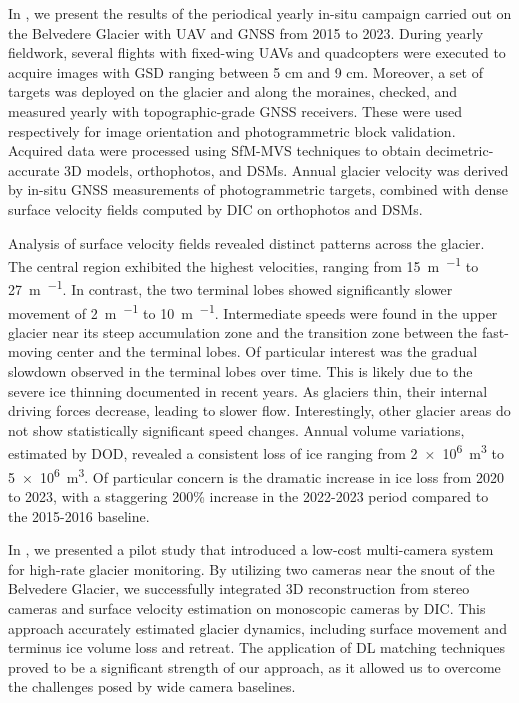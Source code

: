 In , we present the results of the periodical yearly in-situ campaign carried out on the Belvedere Glacier with UAV and GNSS from 2015 to 2023.
During yearly fieldwork, several flights with fixed-wing UAVs and quadcopters were executed to acquire images with GSD ranging between 5 cm and 9 cm. 
Moreover, a set of targets was deployed on the glacier and along the moraines, checked, and measured yearly with topographic-grade GNSS receivers.
These were used respectively for image orientation and photogrammetric block validation.
Acquired data were processed using SfM-MVS techniques to obtain decimetric-accurate 3D models, orthophotos, and DSMs. 
Annual glacier velocity was derived by in-situ GNSS measurements of photogrammetric targets, combined with dense surface velocity fields computed by DIC on orthophotos and DSMs. 

Analysis of surface velocity fields revealed distinct patterns across the glacier. 
The central region exhibited the highest velocities, ranging from \SI{15}{\meter\per\year} to \SI{27}{\meter\per\year}.
In contrast, the two terminal lobes showed significantly slower movement of \SI{2}{\meter\per\year} to \SI{10}{\meter\per\year}.
Intermediate speeds were found in the upper glacier near its steep accumulation zone and the transition zone between the fast-moving center and the terminal lobes.  
Of particular interest was the gradual slowdown observed in the terminal lobes over time.
This is likely due to the severe ice thinning documented in recent years. 
As glaciers thin, their internal driving forces decrease, leading to slower flow.
Interestingly, other glacier areas do not show statistically significant speed changes.
Annual volume variations, estimated by DOD, revealed a consistent loss of ice ranging from \SI{2e6}{\cubic\meter} to \SI{5e6}{\cubic\meter}.
Of particular concern is the dramatic increase in ice loss from 2020 to 2023, with a staggering 200\% increase in the 2022-2023 period compared to the 2015-2016 baseline.

In , we presented a pilot study that introduced a low-cost multi-camera system for high-rate glacier monitoring. 
By utilizing two cameras near the snout of the Belvedere Glacier, we successfully integrated 3D reconstruction from stereo cameras and surface velocity estimation on monoscopic cameras by DIC. 
This approach accurately estimated glacier dynamics, including surface movement and terminus ice volume loss and retreat. 
The application of DL matching techniques proved to be a significant strength of our approach, as it allowed us to overcome the challenges posed by wide camera baselines. 

